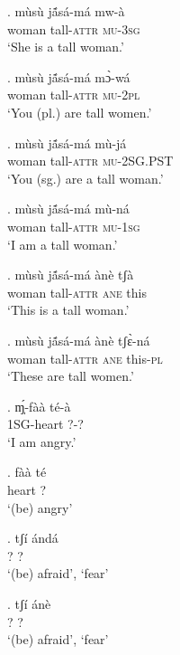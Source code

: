 \documentclass{assets/fieldnotes}
\begin{document}
\exg. mùsù jã́sá-má mw-à\\
woman tall-\textsc{attr} \textsc{mu}-\textsc{3sg}\\
`She is a tall woman.’

\exg. mùsù jã́sá-má mɔ̀-wá\\
woman tall-\textsc{attr} \textsc{mu}-\textsc{2pl}\\
`You (pl.) are tall women.’

\exg. mùsù jã́sá-má mù-já\\
woman tall-\textsc{attr} \textsc{mu}-\textsc{2SG.PST}\\
`You (sg.) are a tall woman.’

\exg. mùsù jã́sá-má mù-ná\\
woman tall-\textsc{attr} \textsc{mu}-\textsc{1sg}\\
`I am a tall woman.’


\exg. mùsù jã́sá-má ànè tʃà \\
woman tall-\textsc{attr} \textsc{ane} this\\
`This is a tall woman.’

\exg. mùsù jã́sá-má ànè tʃɛ̀-ná\\
woman tall-\textsc{attr} \textsc{ane} this-\textsc{pl}\\
`These are tall women.’


\exg. ɱ̩́-fàà té-à\\
\textsc{1SG}-heart ?-?\\
`I am angry.’

\exg. fàà té\\
heart ?\\
`(be) angry’
    
\exg. tʃí ándá\\
? ?\\
`(be) afraid’, `fear’

\exg. tʃí ánè\\
? ?\\
`(be) afraid’, `fear’
\end{document}
